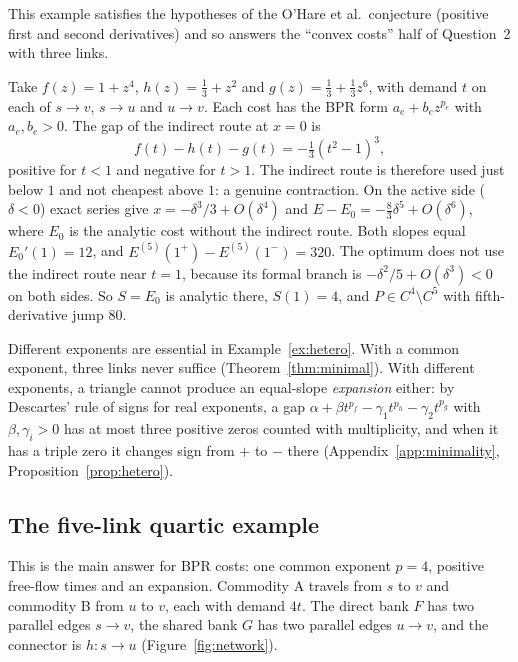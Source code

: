 This example satisfies the hypotheses of the O'Hare et al.\ conjecture (positive first and second derivatives) and so answers the ``convex costs'' half of Question~2 with three links.

\begin{example}\label{ex:hetero}
Take $f(z)=1+z^4$, $h(z)=\tfrac13+z^2$ and $g(z)=\tfrac13+\tfrac13z^6$, with demand $t$ on each of $s\to v$, $s\to u$ and $u\to v$. Each cost has the BPR form $a_e+b_ez^{p_e}$ with $a_e,b_e>0$. The gap of the indirect route at $x=0$ is
\[
 f(t)-h(t)-g(t)=-\tfrac13(t^2-1)^3,
\]
positive for $t<1$ and negative for $t>1$. The indirect route is therefore used just below $1$ and not cheapest above $1$: a genuine contraction. On the active side ($\delta<0$) exact series give $x=-\delta^3/3+O(\delta^4)$ and $E-E_0=-\tfrac83\delta^5+O(\delta^6)$, where $E_0$ is the analytic cost without the indirect route. Both slopes equal $E_0'(1)=12$, and $E^{(5)}(1^+)-E^{(5)}(1^-)=320$. The optimum does not use the indirect route near $t=1$, because its formal branch is $-\delta^2/5+O(\delta^3)<0$ on both sides. So $S=E_0$ is analytic there, $S(1)=4$, and $P\in C^4\setminus C^5$ with fifth-derivative jump $80$. 
\end{example}

Different exponents are essential in Example~\ref{ex:hetero}. With a common exponent, three links never suffice (Theorem~\ref{thm:minimal}). With different exponents, a triangle cannot produce an equal-slope \emph{expansion} either: by Descartes' rule of signs for real exponents, a gap $\alpha+\beta t^{p_f}-\gamma_1t^{p_h}-\gamma_2t^{p_g}$ with $\beta,\gamma_i>0$ has at most three positive zeros counted with multiplicity, and when it has a triple zero it changes sign from $+$ to $-$ there (Appendix~\ref{app:minimality}, Proposition~\ref{prop:hetero}).

\subsection{The five-link quartic example}\label{sec:fiveedge}

This is the main answer for BPR costs: one common exponent $p=4$, positive free-flow times and an expansion. Commodity A travels from $s$ to $v$ and commodity B from $u$ to $v$, each with demand $4t$. The direct bank $F$ has two parallel edges $s\to v$, the shared bank $G$ has two parallel edges $u\to v$, and the connector is $h:s\to u$ (Figure~\ref{fig:network}).


